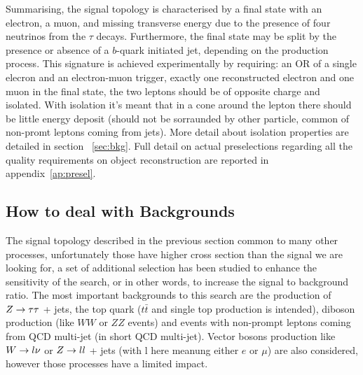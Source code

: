 
Summarising, the signal topology is characterised by a final state with an
electron, a muon, and missing transverse energy due to the
presence of four neutrinos from the $\tau$ decays. Furthermore, the
final state may be split by the presence or
absence of a $b$-quark initiated jet, depending on the production
process. This signature is achieved experimentally by requiring:
an OR of a single elecron and an electron-muon trigger, exactly
one reconstructed electron and one muon in the final state, the two 
leptons should be of opposite charge and isolated. With isolation                               %
it's meant that in a cone around the lepton there should be little energy deposit (should not be sorraunded by                 
other particle, common of non-promt leptons coming from jets). More detail about isolation properties
are detailed in section ~\ref{sec:bkg}. Full detail on actual preselections regarding all the quality requirements    
on object reconstruction are reported in appendix~\ref{ap:presel}.                                                             
   


\subsection{How to deal with Backgrounds}
The signal topology described in the previous section common to many other processes, unfortunately 
those have higher cross section than the signal we are looking for,
a set of additional selection has been studied to enhance the sensitivity of the search, or in other words,
to increase the signal  to background  ratio. The most important backgrounds to this search are the production of
 $Z\rightarrow \tau\tau $ + jets, the top quark ($t\bar{t}$ and single top production is intended), diboson production 
(like $WW$ or $ZZ$ events) and events with non-prompt leptons coming from QCD multi-jet (in short QCD multi-jet).
Vector bosons production like  $W\rightarrow l\nu$ or $Z\rightarrow ll$ + jets (with l here meanung either $e$ or $\mu$) are also considered,
however those processes have a limited impact.

